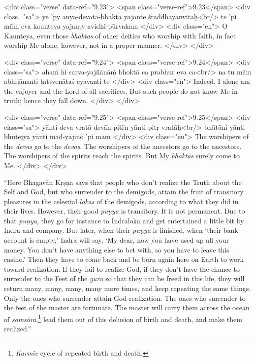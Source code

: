 \begin{html}
<div class="verse" data-ref="9.23">
  <span class="verse-ref">9.23</span>
  <div class="sa">
    ye ’py anya-devatā-bhaktā yajante śraddhayānvitāḥ<br/>
    te ’pi mām eva kaunteya yajanty avidhi-pūrvakam
  </div>
  <div class="en">
    O Kaunteya, even those \textit{bhaktas} of other deities who worship with faith, in fact worship Me alone, however, not in a proper manner.
  </div>
</div>
\end{html}



\begin{html}
<div class="verse" data-ref="9.24">
  <span class="verse-ref">9.24</span>
  <div class="sa">
    ahaṁ hi sarva-yajñānāṁ bhoktā ca prabhur eva ca<br/>
    na tu mām abhijānanti tattvenātaś cyavanti te
  </div>
  <div class="en">
    Indeed, I alone am the enjoyer and the Lord of all sacrifices. But such people do not know Me in truth; hence they fall down.
  </div>
</div>
\end{html}



\begin{html}
<div class="verse" data-ref="9.25">
  <span class="verse-ref">9.25</span>
  <div class="sa">
    yānti deva-vratā devān pitṝn yānti pitṛ-vratāḥ<br/>
    bhūtāni yānti bhūtejyā yānti mad-yājino ’pi mām
  </div>
  <div class="en">
    The worshipers of the \textit{devas} go to the \textit{devas}. The worshipers of the ancestors go to the ancestors. The worshipers of the spirits reach the spirits. But My \textit{bhaktas} surely come to Me.
  </div>
</div>
\end{html}


\enquote{Here Bhagavān Kṛṣṇa says that people who don’t realize the Truth about the Self and God, but who surrender to the demigods, attain the fruit of transitory pleasures in the celestial \textit{lokas} of the demigods, according to what they did in their lives. However, their good \textit{puṇya} is transitory. It is not permanent. Due to that \textit{puṇya}, they go for instance to Indraloka and get entertained a little bit by Indra and company. But later, when their \textit{puṇya} is finished, when \enquote{their bank account is empty,} Indra will say, \enquote{My dear, now you have used up all your money. You don’t have anything else to bet with, so you have to leave this casino.} Then they have to come back and be born again here on Earth to work toward realization. If they fail to realize God, if they don’t have the chance to surrender to the Feet of the \textit{guru} so that they can be freed in this life, they will return many, many, many, many more times, and keep repeating the same things. Only the ones who surrender attain God-realization. The ones who surrender to the feet of the master are fortunate. The master will carry them across the ocean of \textit{saṁsāra},\footnote{\textit{Karmic} cycle of repeated birth and death.} lead them out of this delusion of birth and death, and make them realized.}

